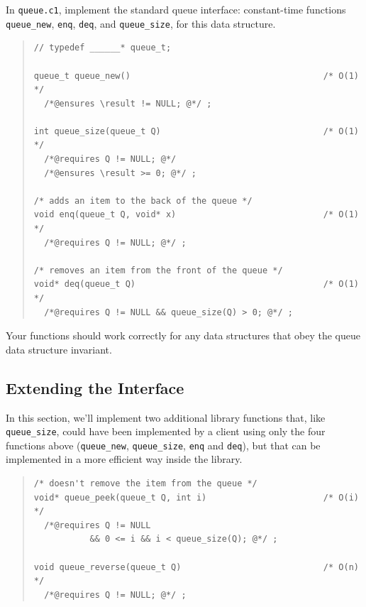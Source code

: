 \documentclass[12pt]{exam}
\begin{document}

\begin{task}[2]
In \lstinline'queue.c1', implement the standard queue interface:
constant-time functions \lstinline'queue_new',
\lstinline'enq', \lstinline'deq', and
\lstinline'queue_size', for this data structure.
\begin{quote}
\begin{lstlisting}
// typedef ______* queue_t;

queue_t queue_new()                                      /* O(1) */
  /*@ensures \result != NULL; @*/ ;

int queue_size(queue_t Q)                                /* O(1) */
  /*@requires Q != NULL; @*/
  /*@ensures \result >= 0; @*/ ;

/* adds an item to the back of the queue */
void enq(queue_t Q, void* x)                             /* O(1) */
  /*@requires Q != NULL; @*/ ;

/* removes an item from the front of the queue */
void* deq(queue_t Q)                                     /* O(1) */
  /*@requires Q != NULL && queue_size(Q) > 0; @*/ ;
\end{lstlisting}
\end{quote}
Your functions should work correctly for any data structures that obey
the queue data structure invariant.
\end{task}

\subsection{Extending the Interface}

In this section, we'll implement two additional library functions
that, like \lstinline'queue_size', could have been implemented by a
client using only the four functions above (\lstinline'queue_new',
\lstinline'queue_size', \lstinline'enq' and \lstinline'deq'), but that
can be implemented in a more efficient way inside the library.

\begin{quote}
\begin{lstlisting}
/* doesn't remove the item from the queue */
void* queue_peek(queue_t Q, int i)                       /* O(i) */
  /*@requires Q != NULL
           && 0 <= i && i < queue_size(Q); @*/ ;

void queue_reverse(queue_t Q)                            /* O(n) */
  /*@requires Q != NULL; @*/ ;
\end{lstlisting}
\end{quote}
\end{document}
